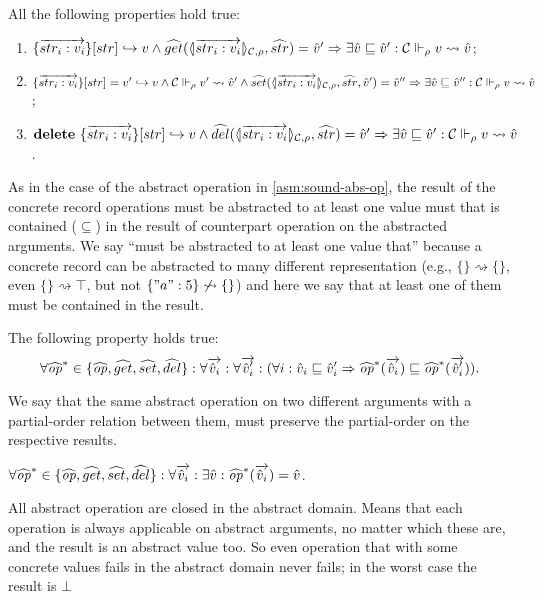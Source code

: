 \begin{assumption}
\label{asm:sound-abs-records}
All the following properties hold true:
\begin{enumerate}
\item $\{\overrightarrow{str_i:v_i}\}[str] \hookrightarrow v \wedge \widehat{get}(\langle\!| \overrightarrow{str_i:v_i} |\!\rangle_{{\cal C},\rho},\widehat{str}) = \hat{v}' \Rightarrow \exists \hat{v} \sqsubseteq \hat{v}': {\cal C} \Vdash_{\rho} v \rightsquigarrow \hat{v}$;
\item $\{\overrightarrow{str_i:v_i}\}[str] = v' \hookrightarrow v \wedge {\cal C} \Vdash_{\rho} v' \rightsquigarrow \hat{v}' \wedge \widehat{set}(\langle\!| \overrightarrow{str_i:v_i} |\!\rangle_{{\cal C},\rho},\widehat{str},\hat{v}') = \hat{v}'' \Rightarrow \exists \hat{v} \sqsubseteq \hat{v}'': {\cal C} \Vdash_{\rho} v \rightsquigarrow \hat{v}$;
\item $\mathbf{delete}\ \{\overrightarrow{str_i:v_i}\}[str] \hookrightarrow v \wedge \widehat{del}(\langle\!| \overrightarrow{str_i:v_i} |\!\rangle_{{\cal C},\rho},\widehat{str}) = \hat{v}' \Rightarrow \exists \hat{v} \sqsubseteq \hat{v}': {\cal C} \Vdash_{\rho} v \rightsquigarrow \hat{v}$.
\end{enumerate}
\end{assumption}
As in the case of the abstract operation in \ref{asm:sound-abs-op}, the result of the concrete record operations must be abstracted to at least one value must that is contained ($\subseteq$) in the result of counterpart operation on the abstracted arguments. We say ``must be abstracted to at least one value that'' because a concrete record can be abstracted to many different representation (e.g., $\{\}\rightsquigarrow \{\}$, even $\{\} \rightsquigarrow \top$, but not $\{"a":5\} \not\rightsquigarrow \{\}$) and here we say that at least one of them must be contained in the result.

\begin{assumption}
\label{asm:mono-abs}
The following property holds true:
\[
\forall \widehat{\mathit{op}}^* \in \{\widehat{\mathit{op}},\widehat{get},\widehat{set},\widehat{del}\}: \forall \overrightarrow{\hat{v}_i}: \forall \overrightarrow{\hat{v}_i'}: (\forall i: \hat{v}_i \sqsubseteq \hat{v}_i' \Rightarrow \widehat{\mathit{op}}^*(\overrightarrow{\hat{v}_i}) \sqsubseteq \widehat{\mathit{op}}^*(\overrightarrow{\hat{v}_i'})).
\]
\end{assumption}
We say that the same abstract operation on two different arguments with a partial-order relation between them, must preserve the partial-order on the respective results.

\begin{assumption}
\label{asm:totality-abs}
$\forall \widehat{\mathit{op}}^* \in \{\widehat{\mathit{op}},\widehat{get},\widehat{set},\widehat{del}\}: \forall \overrightarrow{\hat{v}_i}: \exists \hat{v}: \widehat{\mathit{op}}^*(\overrightarrow{\hat{v}_i}) = \hat{v}$.
\end{assumption}
All abstract operation are closed in the abstract domain. Means that each operation is always applicable on abstract arguments, no matter which these are, and the result is an abstract value too. So even operation that with some concrete values fails in the abstract domain never fails; in the worst case the result is $\bot$


